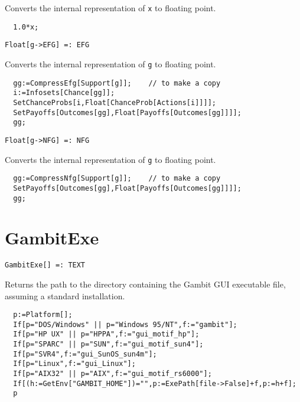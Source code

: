 \noindent
Converts the internal representation of \texttt{x} to floating point.  

\udfbody
\begin{verbatim}
  1.0*x;
\end{verbatim} 

\newsignature

\begin{verbatim}
Float[g->EFG] =: EFG 
\end{verbatim}

\noindent
Converts the internal representation of \texttt{g} to floating point.  

\udfbody
\begin{verbatim}
  gg:=CompressEfg[Support[g]];    // to make a copy
  i:=Infosets[Chance[gg]];
  SetChanceProbs[i,Float[ChanceProb[Actions[i]]]];
  SetPayoffs[Outcomes[gg],Float[Payoffs[Outcomes[gg]]]];
  gg;
\end{verbatim} 

\newsignature

\begin{verbatim}
Float[g->NFG] =: NFG 
\end{verbatim}

\noindent
Converts the internal representation of \texttt{g} to floating point.  

\udfbody
\begin{verbatim}
  gg:=CompressNfg[Support[g]];    // to make a copy
  SetPayoffs[Outcomes[gg],Float[Payoffs[Outcomes[gg]]]];
  gg;
\end{verbatim}


\section*{GambitExe}\label{ExtGambitExe}
\begin{verbatim}
GambitExe[] =: TEXT 
\end{verbatim}

\noindent
Returns the path to the directory containing the Gambit GUI executable
file, assuming a standard installation.  

\udfbody
\begin{verbatim}
  p:=Platform[];
  If[p="DOS/Windows" || p="Windows 95/NT",f:="gambit"];
  If[p="HP UX" || p="HPPA",f:="gui_motif_hp"];
  If[p="SPARC" || p="SUN",f:="gui_motif_sun4"];
  If[p="SVR4",f:="gui_SunOS_sun4m"];
  If[p="Linux",f:="gui_Linux"];
  If[p="AIX32" || p="AIX",f:="gui_motif_rs6000"];
  If[(h:=GetEnv["GAMBIT_HOME"])="",p:=ExePath[file->False]+f,p:=h+f];
  p
\end{verbatim} 

